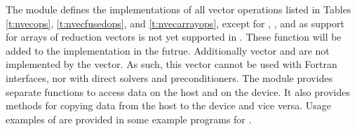 The {\nvecraja} module defines the implementations of all vector operations listed 
in Tables \ref{t:nvecops}, \ref{t:nvecfusedops}, and \ref{t:nvecarrayops}, except
for , , and
 as support for arrays of reduction vectors is not
yet supported in {\raja}. These function will be added to the {\nvecraja}
implementation in the futrue. Additionally vector  and
 are not implemented by the {\raja} vector.
As such, this vector cannot be used with {\sundials} Fortran interfaces,
nor with {\sundials} direct solvers and preconditioners.
The {\nvecraja} module provides separate functions to access data on the host
and on the device. It also provides methods for copying data from the host to 
the device and vice versa. Usage examples of {\nvecraja} are provided in
some example programs for {\cvode} \cite{cvode_ex}.

